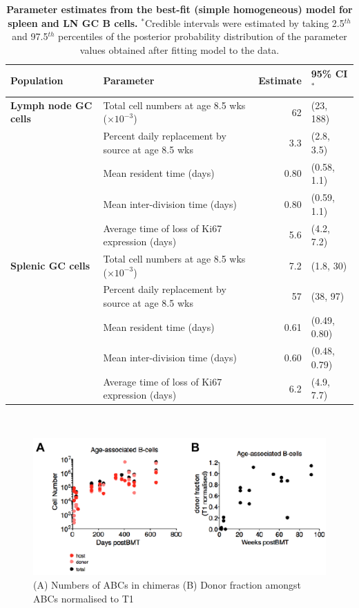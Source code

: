\documentclass[11pt,onecolumn]{article}
\begin{document}
\begin{table}[h!]
	\begin{center}
		\renewcommand{\arraystretch}{1.25}
		\begin{tabular}{l l r l } 
			\toprule 
			\textbf{Population} & \textbf{Parameter}  &  {\small Estimate}  &  {\small 95\% CI$^{\ast}$} \\ 
			\toprule
			\textbf{Lymph node GC cells} & Total cell numbers at age 8.5 wks ($\times 10^{-3}$)     & 62      &  (23, 188)    \\ 
			& Percent daily replacement by source at age 8.5 wks                                    & 3.3     &  (2.8, 3.5)   \\
			& Mean resident time (days)                                                             & 0.80    &  (0.58, 1.1)  \\ 
			& Mean inter-division time (days)                                                       & 0.80    &  (0.59, 1.1)  \\ 	
			& Average time of loss of Ki67 expression (days)                                        & 5.6     &  (4.2, 7.2)  \\		
			\textbf{Splenic GC cells} & Total cell numbers at age 8.5 wks ($\times 10^{-3}$)        & 7.2     &  (1.8, 30)    \\ 
			& Percent daily replacement by source at age 8.5 wks                                    & 57      &  (38, 97)   \\
			& Mean resident time (days)                                                             & 0.61    &  (0.49, 0.80)  \\ 
			& Mean inter-division time (days)                                                       & 0.60    &  (0.48, 0.79)  \\ 	
			& Average time of loss of Ki67 expression (days)                                        & 6.2     &  (4.9, 7.7)  \\		
			\hline
			\toprule 
		\end{tabular}
	\end{center}
	\caption{\small \textbf{Parameter estimates from the best-fit (simple homogeneous) model for spleen and LN GC B cells.}  $^{\ast}$Credible intervals were estimated by taking 2.5$^{th}$ and 97.5$^{th}$ percentiles of the posterior probability distribution of the parameter values obtained after fitting model to the data.}
	\label{tab:GC-parestm}
\end{table} \


\begin{figure}[htbp] %
   \centering
   \includegraphics[width=\linewidth]{ABCs.pdf} 
   \caption{(A) Numbers of ABCs in chimeras (B) Donor fraction amongst ABCs normalised to T1 }
   \label{fig:ABCs}
\end{figure}
\end{document}
